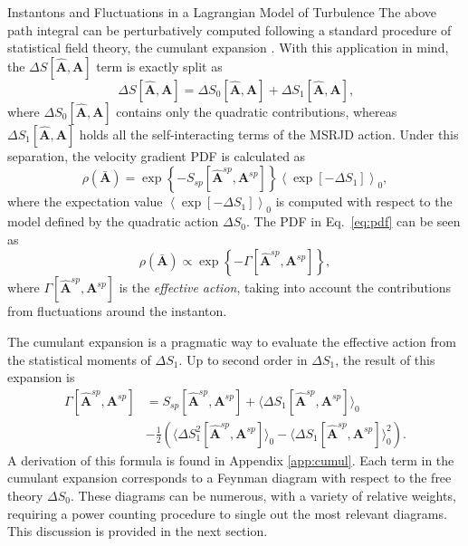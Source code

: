 \begin{chapter}{Instantons and Fluctuations in a Lagrangian Model of Turbulence}
The above path integral can be perturbatively computed following a standard procedure of statistical field theory, the cumulant expansion \parencite{amit2005}. 
With this application in mind, the $ \Delta S[\hat {\mathbf{A}}, {\mathbf{A}}]$ term is exactly split as
\begin{equation} \label{deltaS}
 \Delta S[\hat {\mathbf{A}}, {\mathbf{A}}] = \Delta S_0[\hat {\mathbf{A}}, {\mathbf{A}}] + \Delta S_1[\hat {\mathbf{A}}, {\mathbf{A}}] \mbox{,}
\end{equation}
where $ \Delta S_0 [\hat {\mathbf{A}}, {\mathbf{A}}] $ contains only the quadratic contributions, whereas $ \Delta S_1 [\hat {\mathbf{A}}, {\mathbf{A}}] $ holds all the self-interacting terms of the MSRJD action.
Under this separation, the velocity gradient PDF is calculated as 
\begin{equation} \label{eq:pdf}
 \rho(\bar {\mathbf{A}}) = \exp \left\{ -S_{sp}[\hat {\mathbf{A}}^ {sp}, {\mathbf{A}}^ {sp}] \right\}
 \left\langle \exp [ -\Delta S_1 ] \right\rangle_0 ,
\end{equation}
where the expectation value $ \left\langle \exp [ -\Delta S_1 ] \right\rangle_0 $ is computed 
with respect to the model defined by the quadratic action $ \Delta S_0$.
The PDF in Eq.~\eqref{eq:pdf} can be seen as 
\begin{equation} \label{nn_vgPDF}
\rho(\bar {\mathbf{A}}) \propto \exp \left\{ -\Gamma[\hat {\mathbf{A}}^{sp}, {\mathbf{A}}^{sp} ] \right\} , 
\end{equation}
where $\Gamma[\hat{\mathbf{A}}^{sp},\mathbf{A}^{sp}]$ is the \textit{effective action}, taking into account the contributions from fluctuations around the instanton.

The cumulant expansion is a pragmatic way to evaluate the effective action from the statistical moments of $\Delta S_1$. Up to second order in $\Delta S_1$, the result of this expansion is
\begin{equation} \label{eq:cumul-gamma}
\begin{split}
 \Gamma[\hat {\mathbf{A}}^{sp}, {\mathbf{A}}^{sp} ] &= 
 S_{sp}[\hat {\mathbf{A}}^{sp}, {\mathbf{A}}^{sp} ] + \langle \Delta S_1[\hat {\mathbf{A}}^{sp}, {\mathbf{A}}^{sp} ] \rangle_0 \\
 &- \frac{1}{2}
 \left( \langle \Delta S_1^2[\hat {\mathbf{A}}^{sp}, {\mathbf{A}}^{sp} ]  \rangle_0 - \langle \Delta S_1[\hat {\mathbf{A}}^{sp}, {\mathbf{A}}^{sp} ] \rangle_0^2 \right) \mbox{.}
\end{split}
\end{equation}
A derivation of this formula is found in Appendix \ref{app:cumul}.
Each term in the cumulant expansion corresponds to a Feynman diagram with respect to the free theory $\Delta S_0$. These diagrams can be numerous, with a variety of relative weights, requiring a power counting procedure to single out the most relevant diagrams. This discussion is provided in the next section.


\end{chapter}
